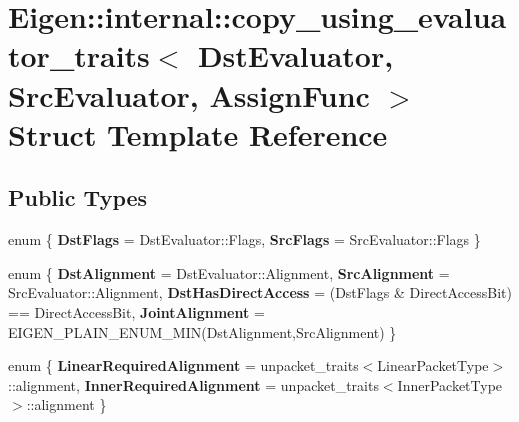 \hypertarget{struct_eigen_1_1internal_1_1copy__using__evaluator__traits}{}\section{Eigen\+::internal\+::copy\+\_\+using\+\_\+evaluator\+\_\+traits$<$ Dst\+Evaluator, Src\+Evaluator, Assign\+Func $>$ Struct Template Reference}
\label{struct_eigen_1_1internal_1_1copy__using__evaluator__traits}
\subsection*{Public Types}
\begin{DoxyCompactItemize}
\item 
\mbox{\label{struct_eigen_1_1internal_1_1copy__using__evaluator__traits_a4005e3a34ac0686b27d36162160e1e72}} 
enum \{ {\bfseries Dst\+Flags} = Dst\+Evaluator\+::Flags, 
{\bfseries Src\+Flags} = Src\+Evaluator\+::Flags
 \}
\item 
\mbox{\label{struct_eigen_1_1internal_1_1copy__using__evaluator__traits_aeaebec864a7d3fececff832478cb5093}} 
enum \{ {\bfseries Dst\+Alignment} = Dst\+Evaluator\+::Alignment, 
{\bfseries Src\+Alignment} = Src\+Evaluator\+::Alignment, 
{\bfseries Dst\+Has\+Direct\+Access} = (Dst\+Flags \& Direct\+Access\+Bit) == Direct\+Access\+Bit, 
{\bfseries Joint\+Alignment} = E\+I\+G\+E\+N\+\_\+\+P\+L\+A\+I\+N\+\_\+\+E\+N\+U\+M\+\_\+\+M\+IN(Dst\+Alignment,Src\+Alignment)
 \}
\item 
\mbox{\label{struct_eigen_1_1internal_1_1copy__using__evaluator__traits_a9b9967ee877c4b1c35aa83dd9d88f25a}} 
enum \{ {\bfseries Linear\+Required\+Alignment} = unpacket\+\_\+traits$<$Linear\+Packet\+Type$>$\+::alignment, 
{\bfseries Inner\+Required\+Alignment} = unpacket\+\_\+traits$<$Inner\+Packet\+Type$>$\+::alignment
 \}
\item 
\mbox{\label{struct_eigen_1_1internal_1_1copy__using__evaluator__traits_a58a8d7110ee25465f0bf47b64f05a39f}} 

\end{DoxyCompactItemize}
